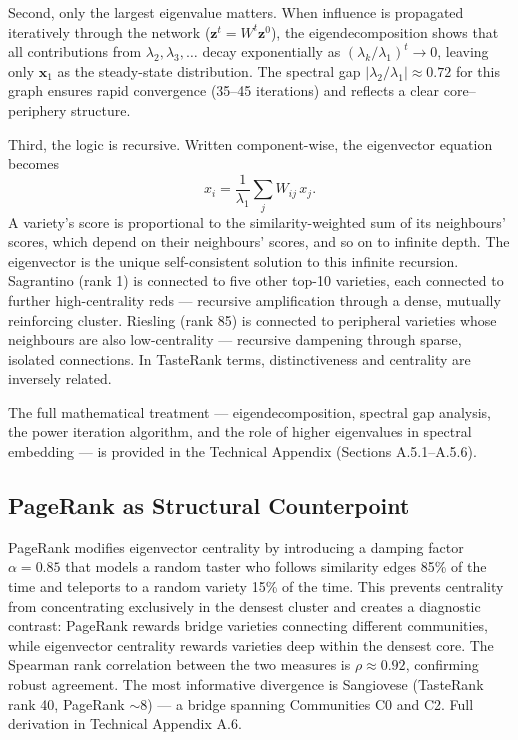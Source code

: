 \documentclass[11pt]{article}
\begin{document}
Second, only the largest eigenvalue matters. When influence is propagated iteratively through the network ($\mathbf{z}^t = W^t \mathbf{z}^0$), the eigendecomposition shows that all contributions from $\lambda_2, \lambda_3, \ldots$ decay exponentially as $(\lambda_k / \lambda_1)^t \to 0$, leaving only $\mathbf{x}_1$ as the steady-state distribution. The spectral gap $|\lambda_2 / \lambda_1| \approx 0.72$ for this graph ensures rapid convergence (35--45 iterations) and reflects a clear core--periphery structure.

Third, the logic is recursive. Written component-wise, the eigenvector equation becomes
\[
x_i = \frac{1}{\lambda_1} \sum_j W_{ij} \, x_j.
\]
A variety's score is proportional to the similarity-weighted sum of its neighbours' scores, which depend on their neighbours' scores, and so on to infinite depth. The eigenvector is the unique self-consistent solution to this infinite recursion. Sagrantino (rank 1) is connected to five other top-10 varieties, each connected to further high-centrality reds --- recursive amplification through a dense, mutually reinforcing cluster. Riesling (rank 85) is connected to peripheral varieties whose neighbours are also low-centrality --- recursive dampening through sparse, isolated connections. In TasteRank terms, distinctiveness and centrality are inversely related.

The full mathematical treatment --- eigendecomposition, spectral gap analysis, the power iteration algorithm, and the role of higher eigenvalues in spectral embedding --- is provided in the Technical Appendix (Sections A.5.1--A.5.6).

\subsection{PageRank as Structural Counterpoint}
PageRank modifies eigenvector centrality by introducing a damping factor $\alpha = 0.85$ that models a random taster who follows similarity edges 85\% of the time and teleports to a random variety 15\% of the time. This prevents centrality from concentrating exclusively in the densest cluster and creates a diagnostic contrast: PageRank rewards bridge varieties connecting different communities, while eigenvector centrality rewards varieties deep within the densest core. The Spearman rank correlation between the two measures is $\rho \approx 0.92$, confirming robust agreement. The most informative divergence is Sangiovese (TasteRank rank 40, PageRank $\sim 8$) --- a bridge spanning Communities C0 and C2. Full derivation in Technical Appendix A.6.
\end{document}
